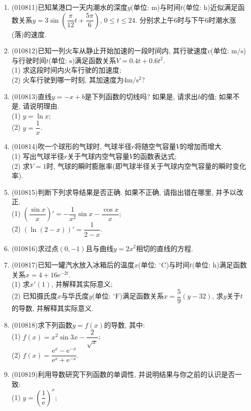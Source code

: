 \documentclass[10pt,a4paper]{article}
\begin{document}
\begin{enumerate}[1.]
\item {\tiny (010811)}已知某港口一天内潮水的深度$y$(单位: $\text{m}$)与时间$t$(单位: $\text{h}$)近似满足函数关系$y=3\sin (\dfrac \pi {12}t+\dfrac{5\pi} 6)$, $0\le t\le 24$. 分别求上午$6$时与下午$6$时潮水涨(落)的速度.
\item {\tiny (010812)}已知一列火车从静止开始加速的一段时间内, 其行驶速度$v$(单位: $\text{m}/\text{s}$)与行驶时间$t$(单位: $\text{s}$)满足函数关系$V=0.4t+0. 6t^2$.\\
(1) 求这段时间内火车行驶的加速度;\\
(2) 火车行驶到哪一时刻, 其加速度为$4\text{m}/\text{s}^2$?
\item {\tiny (010813)}直线$y=-x+b$是下列函数的切线吗? 如果是, 请求出$b$的值; 如果不是, 请说明理由.\\
(1) $y=\ln x$;\\
(2) $y=\dfrac 1x$.
\item {\tiny (010814)}吹一个球形的气球时, 气球半径$r$将随空气容量$V$的增加而增大.\\
(1) 写出气球半径$r$关于气球内空气容量$V$的函数表达式;\\
(2) 求$V=1$时, 气球的瞬时膨胀率(即气球半径关于气球内空气容量的瞬时变化率).
\item {\tiny (010815)}判断下列求导结果是否正确. 如果不正确, 请指出错在哪里, 并予以改正.\\
(1) $(\dfrac{\sin x}x)'=-\dfrac 1{x^2}\sin x-\dfrac{\cos x}x$;\\
(2) $(\ln (2-x))'=\dfrac 1{2-x}$.
\item {\tiny (010816)}求过点$(0, -1)$且与曲线$y=2x^2$相切的直线的方程.
\item {\tiny (010817)}已知一罐汽水放入冰箱后的温度$x$(单位: $^\circ\text{C}$)与时间$t$(单位: $\text{h}$)满足函数关系$x=4+16\mathrm{e}^{-2t}$.\\
(1) 求$x'(1)$, 并解释其实际意义;\\
(2) 已知摄氏度$x$与华氏度$y$(单位: $^\circ\text{F}$)满足函数关系$x=\dfrac 59(y-32)$, 求$y$关于$t$的导数, 并解释其实际意义.
\item {\tiny (010818)}求下列函数$y=f(x)$的导数, 其中:\\
(1) $f(x)=x^2\sin 3x-\dfrac 2{\sqrt x}$;\\
(2) $f(x)=\dfrac{\mathrm{e}^x-\mathrm{e}^{-x}}{\mathrm{e}^x+\mathrm{e}^{-x}}$.
\item {\tiny (010819)}利用导数研究下列函数的单调性, 并说明结果与你之前的认识是否一致:\\
(1) $y=(\dfrac 1{\mathrm{e}})^x$;\\

\end{enumerate}
\end{document}
